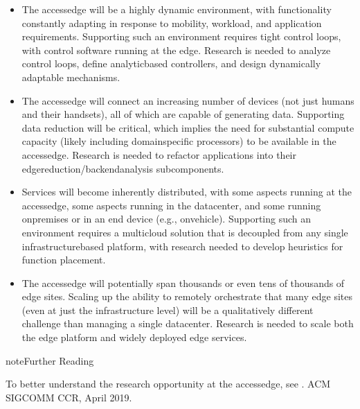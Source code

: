 \documentclass[a4paper,11pt,english]{sphinxmanual}
\begin{document}
\begin{itemize}
\item {} 
\sphinxAtStartPar
{} The access\sphinxhyphen{}edge will be a highly dynamic
environment, with functionality constantly adapting in response to
mobility, workload, and application requirements. Supporting such an
environment requires tight control loops, with control software
running at the edge. Research is needed to analyze control loops,
define analytic\sphinxhyphen{}based controllers, and design dynamically adaptable
mechanisms.

\item {} 
\sphinxAtStartPar
{} The access\sphinxhyphen{}edge will connect an increasing
number of devices (not just humans and their handsets), all of which
are capable of generating data. Supporting data reduction will be
critical, which implies the need for substantial compute capacity
(likely including domain\sphinxhyphen{}specific processors) to be available in the
access\sphinxhyphen{}edge. Research is needed to refactor applications into their
edge\sphinxhyphen{}reduction/backend\sphinxhyphen{}analysis subcomponents.

\item {} 
\sphinxAtStartPar
{} Services will become inherently
distributed, with some aspects running at the access\sphinxhyphen{}edge, some
aspects running in the datacenter, and some running on\sphinxhyphen{}premises or
in an end device (e.g., on\sphinxhyphen{}vehicle). Supporting such an environment
requires a multi\sphinxhyphen{}cloud solution that is decoupled from any single
infrastructure\sphinxhyphen{}based platform, with research needed to develop
heuristics for function placement.

\item {} 
\sphinxAtStartPar
{} The access\sphinxhyphen{}edge will potentially span thousands or
even tens of thousands of edge sites. Scaling up the ability to
remotely orchestrate that many edge sites (even at just the
infrastructure level) will be a qualitatively different challenge
than managing a single datacenter. Research is needed to scale both
the edge platform and widely deployed edge services.

\end{itemize}
\label{\detokenize{cloud:reading-democratizing}}
\begin{sphinxadmonition}{note}{Further Reading}

\sphinxAtStartPar
To better understand the research opportunity at the access\sphinxhyphen{}edge,
see .
ACM SIGCOMM CCR, April 2019.
\end{sphinxadmonition}
\end{document}

